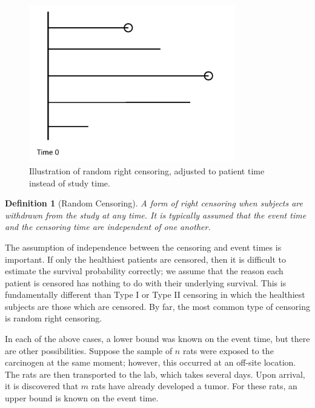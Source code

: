 \documentclass[
]{book}
\theoremstyle{plain}
\theoremstyle{mydefn}
\newtheorem{definition}{Definition}[chapter]
\theoremstyle{myexmpl}
\theoremstyle{remark}
\begin{document}
\begin{figure}

{\centering \includegraphics[width=0.8\textwidth]{images/censoring-random} 

}

\caption{Illustration of random right censoring, adjusted to patient time instead of study time.}\label{fig:surv-censoring-random}
\end{figure}

\begin{definition}[Random Censoring]
\protect\hypertarget{def:defn-random-censoring}{}{\label{def:defn-random-censoring} {} }A form of right censoring when subjects are withdrawn from the study at any time. It is typically assumed that the event time and the censoring time are independent of one another.
\end{definition}

The assumption of independence between the censoring and event times is important. If only the healthiest patients are censored, then it is difficult to estimate the survival probability correctly; we assume that the reason each patient is censored has nothing to do with their underlying survival. This is fundamentally different than Type I or Type II censoring in which the healthiest subjects are those which are censored. By far, the most common type of censoring is random right censoring.

In each of the above cases, a lower bound was known on the event time, but there are other possibilities. Suppose the sample of \(n\) rats were exposed to the carcinogen at the same moment; however, this occurred at an off-site location. The rats are then transported to the lab, which takes several days. Upon arrival, it is discovered that \(m\) rats have already developed a tumor. For these rats, an upper bound is known on the event time.
\end{document}
